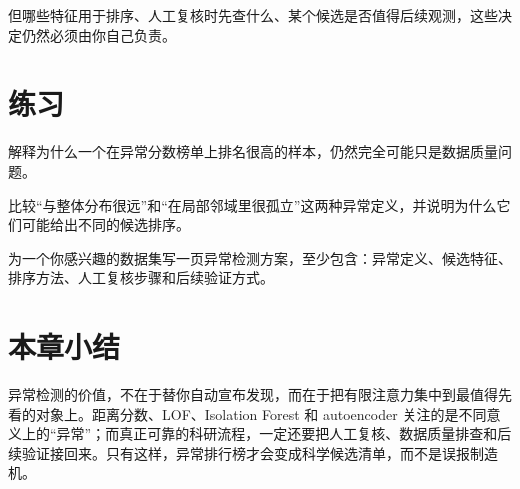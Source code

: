 但哪些特征用于排序、人工复核时先查什么、某个候选是否值得后续观测，这些决定仍然必须由你自己负责。

\section{练习}

\begin{exercisebox}[基础练习]
解释为什么一个在异常分数榜单上排名很高的样本，仍然完全可能只是数据质量问题。
\end{exercisebox}

\begin{exercisebox}[进阶练习]
比较“与整体分布很远”和“在局部邻域里很孤立”这两种异常定义，并说明为什么它们可能给出不同的候选排序。
\end{exercisebox}

\begin{exercisebox}[开放练习]
为一个你感兴趣的数据集写一页异常检测方案，至少包含：异常定义、候选特征、排序方法、人工复核步骤和后续验证方式。
\end{exercisebox}

\section{本章小结}

异常检测的价值，不在于替你自动宣布发现，而在于把有限注意力集中到最值得先看的对象上。距离分数、LOF、Isolation Forest 和 autoencoder 关注的是不同意义上的“异常”；而真正可靠的科研流程，一定还要把人工复核、数据质量排查和后续验证接回来。只有这样，异常排行榜才会变成科学候选清单，而不是误报制造机。
